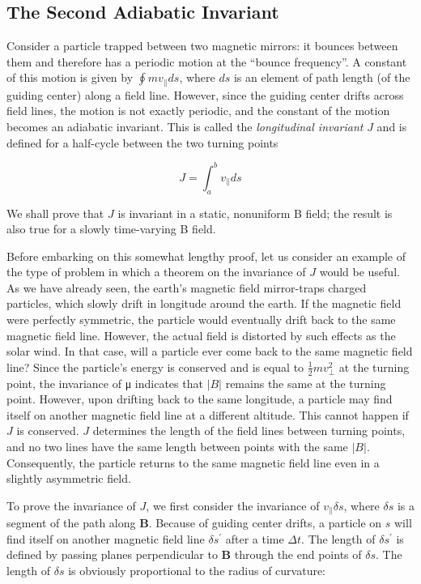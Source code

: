 \documentclass[
  notoc %
]{tufte-book}
\begin{document}
\hypertarget{the-second-adiabatic-invariant}{%
\subsection{The Second Adiabatic
Invariant}\label{the-second-adiabatic-invariant}}

Consider a particle trapped between two magnetic mirrors: it bounces
between them and therefore has a periodic motion at the ``bounce
frequency''. A constant of this motion is given by
\(\oint mv_\parallel ds\), where \(ds\) is an element of path length (of
the guiding center) along a field line. However, since the guiding
center drifts across field lines, the motion is not exactly periodic,
and the constant of the motion becomes an adiabatic invariant. This is
called the \emph{longitudinal invariant} \(J\) and is defined for a
half-cycle between the two turning points

\[
J = \int_a^b v_\parallel ds
\]

We shall prove that \(J\) is invariant in a static, nonuniform B field;
the result is also true for a slowly time-varying B field.

Before embarking on this somewhat lengthy proof, let us consider an
example of the type of problem in which a theorem on the invariance of
\(J\) would be useful. As we have already seen, the earth's magnetic
field mirror-traps charged particles, which slowly drift in longitude
around the earth. If the magnetic field were perfectly symmetric, the
particle would eventually drift back to the same magnetic field line.
However, the actual field is distorted by such effects as the solar
wind. In that case, will a particle ever come back to the same magnetic
field line? Since the particle's energy is conserved and is equal to
\(\frac{1}{2} mv_\perp^2\) at the turning point, the invariance of μ
indicates that \(|B|\) remains the same at the turning point. However,
upon drifting back to the same longitude, a particle may find itself on
another magnetic field line at a different altitude. This cannot happen
if \(J\) is conserved. \(J\) determines the length of the field lines
between turning points, and no two lines have the same length between
points with the same \(|B|\). Consequently, the particle returns to the
same magnetic field line even in a slightly asymmetric field.

To prove the invariance of \(J\), we first consider the invariance of
\(v_\parallel \delta s\), where \(\delta s\) is a segment of the path
along \(\mathbf{B}\). Because of guiding center drifts, a particle on
\(s\) will find itself on another magnetic field line
\(\delta s^\prime\) after a time \(\Delta t\). The length of
\(\delta s^\prime\) is defined by passing planes perpendicular to
\(\mathbf{B}\) through the end points of \(\delta s\). The length of
\(\delta s\) is obviously proportional to the radius of curvature:
\end{document}
